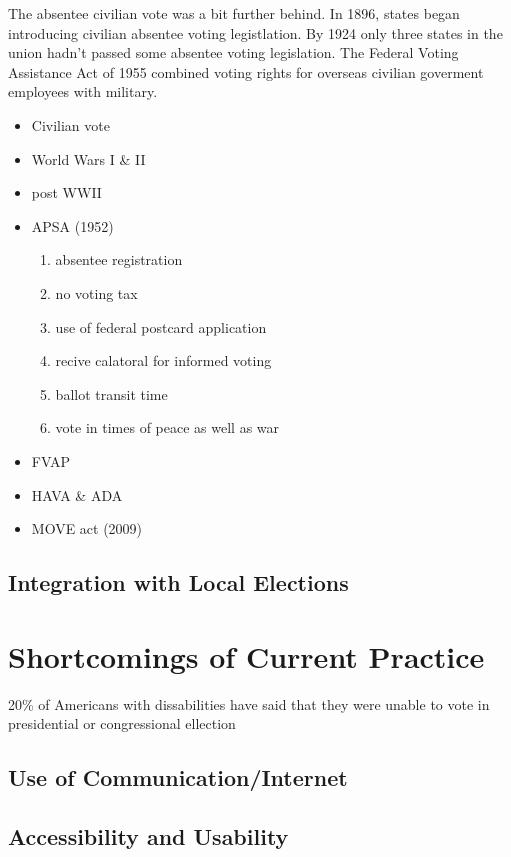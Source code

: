 The absentee civilian vote was a bit further behind. In 1896, states began introducing civilian absentee voting legistlation. By 1924 only three states in the union hadn't passed some absentee voting legislation. The Federal Voting Assistance Act of 1955 combined voting rights for overseas civilian goverment employees with military.




\begin{itemize}
\item Civilian vote
\item World Wars I \& II
\item post WWII
\item APSA (1952)
\begin{enumerate}
\item absentee registration
\item no voting tax
\item use of federal postcard application
\item recive calatoral for informed voting
\item ballot transit time %
\item vote in times of peace as well as war
\end{enumerate}
\item FVAP
\item HAVA \& ADA
\item MOVE act (2009) %
\end{itemize}

\subsection{Integration with Local Elections}
\section{Shortcomings of Current Practice}

20\% of Americans with dissabilities have said that they were unable to vote in presidential or congressional ellection

\subsection{Use of Communication/Internet}
\subsection{Accessibility and Usability}
